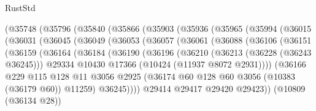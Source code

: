 \begin{lexlean}{RustStd}
\begin{coremodule}
          (@35748
            (@35796
              (@35840
                (@35866
                  (@35903
                    (@35936
                      (@35965
                        (@35994
                          (@36015
                            (@36031
                              (@36045
                                (@36049
                                  (@36053
                                    (@36057
                                      (@36061
                                        (@36088
                                          (@36106
                                            (@36151
                                              (@36159
                                                (@36164
                                                  (@36184
                                                    (@36190
                                                      (@36196
                                                        (@36210
                                                          (@36213 (@36228 (@36243 @36245)))
                                                          @29334
                                                          @10430
                                                          @17366
                                                          (@10424 (@11937 @8072 @2931))))
                                                      (@36166
                                                        @229
                                                        @115
                                                        @128
                                                        @11
                                                        @3056
                                                        @2925
                                                        (@36174
                                                          @60
                                                          @128
                                                          @60
                                                          @3056
                                                          (@10383 (@36179 @60))
                                                          @11259)
                                                        @36245))))
                                                @29414
                                                @29417
                                                @29420
                                                @29423))
                                            (@10809 (@36134 @28))

\end{coremodule}
\end{lexlean}
